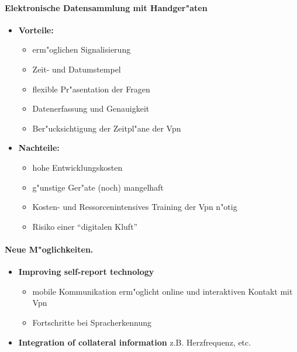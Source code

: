 \paragraph{Elektronische Datensammlung mit Handger"aten}
\begin{itemize}
        \item \textbf{Vorteile:}
                \begin{itemize}
                        \item erm"oglichen Signalisierung
                        \item Zeit- und Datumstempel
                        \item flexible Pr"asentation der Fragen
                        \item Datenerfassung und Genauigkeit
                        \item Ber"ucksichtigung der Zeitpl"ane der Vpn
                \end{itemize}
        \item \textbf{Nachteile:}
                \begin{itemize}
                        \item hohe Entwicklungskosten
                        \item g"unstige Ger"ate (noch) mangelhaft
                        \item Kosten- und Ressorcenintensives Training der Vpn n"otig
                        \item Risiko einer ``digitalen Kluft''
                \end{itemize}
\end{itemize}

\paragraph{Neue M"oglichkeiten.}
\begin{itemize}
        \item \textbf{Improving self-report technology}
                \begin{itemize}
                        \item mobile Kommunikation erm"oglicht online und interaktiven Kontakt mit Vpn
                        \item Fortschritte bei Spracherkennung 
                \end{itemize}
        \item \textbf{Integration of collateral information} z.B. Herzfrequenz, etc.
\end{itemize}

